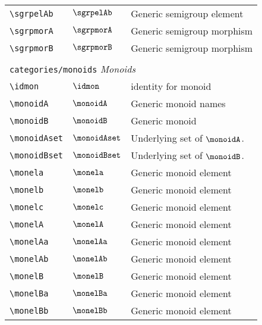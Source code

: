 \begin{longtable}{lll}
 {\color[rgb]{0.5,0.5,0.5}\texttt{\textbackslash sgrpelAb}} & $\sgrpelAb$ &  Generic semigroup element\\ 
 {\color[rgb]{0.5,0.5,0.5}\texttt{\textbackslash sgrpmorA}} & $\sgrpmorA$ &  Generic semigroup morphism\\ 
 {\color[rgb]{0.5,0.5,0.5}\texttt{\textbackslash sgrpmorB}} & $\sgrpmorB$ &  Generic semigroup morphism\\ 
  &  & \\ 
 \multicolumn{3}{l}{{\color[rgb]{0.5,0.5,0.5}\texttt{categories/monoids}} \emph{Monoids}}\\ 
 \hline
{\color[rgb]{0.5,0.5,0.5}\texttt{\textbackslash idmon}} & $\idmon$ &  identity for monoid\\ 
 {\color[rgb]{0.5,0.5,0.5}\texttt{\textbackslash monoidA}} & $\monoidA$ &  Generic monoid names\\ 
 {\color[rgb]{0.5,0.5,0.5}\texttt{\textbackslash monoidB}} & $\monoidB$ &  Generic monoid\\ 
 {\color[rgb]{0.5,0.5,0.5}\texttt{\textbackslash monoidAset}} & $\monoidAset$ &  Underlying set of $\monoidA$.\\ 
 {\color[rgb]{0.5,0.5,0.5}\texttt{\textbackslash monoidBset}} & $\monoidBset$ &  Underlying set of $\monoidB$.\\ 
 {\color[rgb]{0.5,0.5,0.5}\texttt{\textbackslash monela}} & $\monela$ &  Generic monoid element\\ 
 {\color[rgb]{0.5,0.5,0.5}\texttt{\textbackslash monelb}} & $\monelb$ &  Generic monoid element\\ 
 {\color[rgb]{0.5,0.5,0.5}\texttt{\textbackslash monelc}} & $\monelc$ &  Generic monoid element\\ 
 {\color[rgb]{0.5,0.5,0.5}\texttt{\textbackslash monelA}} & $\monelA$ &  Generic monoid element\\ 
 {\color[rgb]{0.5,0.5,0.5}\texttt{\textbackslash monelAa}} & $\monelAa$ &  Generic monoid element\\ 
 {\color[rgb]{0.5,0.5,0.5}\texttt{\textbackslash monelAb}} & $\monelAb$ &  Generic monoid element\\ 
 {\color[rgb]{0.5,0.5,0.5}\texttt{\textbackslash monelB}} & $\monelB$ &  Generic monoid element\\ 
 {\color[rgb]{0.5,0.5,0.5}\texttt{\textbackslash monelBa}} & $\monelBa$ &  Generic monoid element\\ 
 {\color[rgb]{0.5,0.5,0.5}\texttt{\textbackslash monelBb}} & $\monelBb$ &  Generic monoid element\\ 

\end{longtable}
